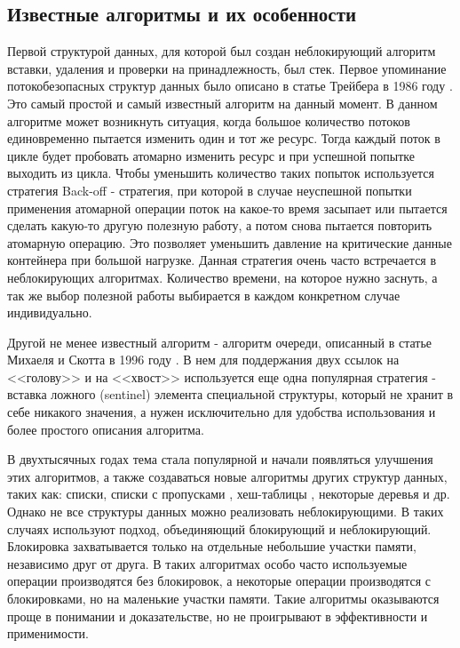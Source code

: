 \documentclass[12pt]{article}
\begin{document}
{			\subsection{Известные алгоритмы и их особенности}
				\par Первой структурой данных, для которой был создан неблокирующий алгоритм вставки, удаления и проверки на принадлежность, был стек. Первое упоминание потокобезопасных структур данных было описано в статье Трейбера в 1986 году \cite{Treiber}. Это самый простой и самый известный алгоритм на данный момент. В данном алгоритме может возникнуть ситуация, когда большое количество потоков единовременно пытается изменить один и тот же ресурс. Тогда каждый поток в цикле будет пробовать атомарно изменить ресурс и при успешной попытке выходить из цикла. Чтобы уменьшить количество таких попыток используется стратегия Back-off - стратегия, при которой в случае неуспешной попытки применения атомарной операции поток на какое-то время засыпает или пытается сделать какую-то другую полезную работу, а потом снова пытается повторить атомарную операцию. Это позволяет уменьшить давление на критические данные контейнера при большой нагрузке. Данная стратегия очень часто встречается в неблокирующих алгоритмах. Количество времени, на которое нужно заснуть, а так же выбор полезной работы выбирается в каждом конкретном случае индивидуально.
				\par Другой не менее известный алгоритм - алгоритм очереди, описанный в статье Михаеля и Скотта в 1996 году \cite{Queqe}. В нем для поддержания двух ссылок на <<голову>> и на <<хвост>> используется еще одна популярная стратегия - вставка ложного (sentinel) элемента специальной структуры, который не хранит в себе никакого значения, а нужен исключительно для удобства использования и более простого описания алгоритма.
				\par В двухтысячных годах тема стала популярной и начали появляться улучшения этих алгоритмов, а также создаваться новые алгоритмы других структур данных, таких как: списки\cite{LinkedList}, списки с пропусками \cite{ListSkipList},  хеш-таблицы \cite{HashTable}, некоторые деревья и др. Однако не все структуры данных можно реализовать неблокирующими. В таких случаях используют подход, объединяющий блокирующий и неблокирующий. Блокировка захватывается только на отдельные небольшие участки памяти, независимо друг от друга. В таких алгоритмах особо часто используемые операции производятся без блокировок, а некоторые операции производятся с блокировками, но на маленькие участки памяти. Такие алгоритмы оказываются проще в понимании и доказательстве, но не проигрывают в эффективности и применимости.  
}
\end{document}
